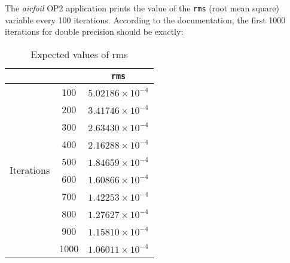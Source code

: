 The \textit{airfoil} OP2 application prints the value of the \verb|rms| (root mean square) variable every 100 iterations. According to the documentation, the first 1000 iterations for double precision should be exactly:\\
\begin{table}[h!]
\vspace{-2em}
\centering
\renewcommand{\arraystretch}{1.2}
\begin{tabular}{c c || c }
& & \verb|rms| \\
\hline
\multirow{10}{*}{Iterations} & 100 & $ 5.02186\times10^{-4} $ \\
& 200 & $ 3.41746\times10^{-4} $ \\
& 300 & $ 2.63430\times10^{-4} $ \\
& 400 & $ 2.16288\times10^{-4} $ \\
& 500 & $ 1.84659\times10^{-4} $ \\
& 600 & $ 1.60866\times10^{-4} $ \\
& 700 & $ 1.42253\times10^{-4} $ \\
& 800 & $ 1.27627\times10^{-4} $ \\
& 900 & $ 1.15810\times10^{-4} $ \\
& 1000 & $ 1.06011\times10^{-4} $
\end{tabular}
\caption{Expected values of rms}
\label{tab:expected}

\end{table}

